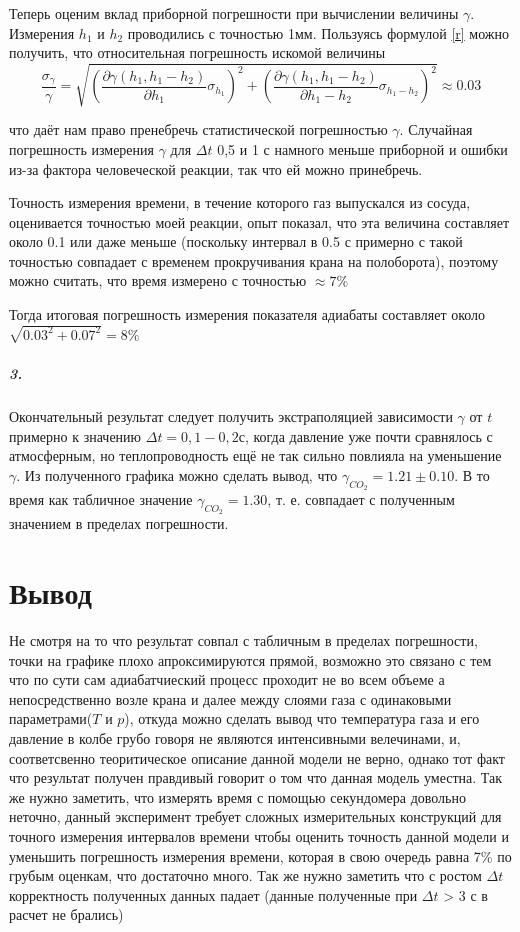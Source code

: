 \documentclass[a4paper,12pt]{article}
\begin{document}
Теперь оценим вклад приборной погрешности при вычислении величины $\gamma$. Измерения $h_1$  и $h_2$ проводились с точностью 1мм. Пользуясь формулой \eqref{r} можно получить, что относительная погрешность искомой величины $$\dfrac{\sigma_\gamma}{\gamma} = \sqrt{\left(\dfrac{\partial\gamma(h_1, h_1 - h_2)}{\partial h_1}\sigma_{h_1}\right)^2 + {\left(\dfrac{\partial\gamma(h_1, h_1 - h_2)}{\partial h_1 - h_2}\sigma_{h_1 - h_2}\right)^2} }\approx 0.03$$

что даёт нам право пренебречь статистической погрешностью $\gamma$. Случайная погрешность измерения $\gamma$ для $\Delta t$ 0,5 и 1 с намного меньше приборной и ошибки из-за фактора человеческой реакции, так что ей можно принебречь.


Точность измерения времени, в течение которого газ выпускался из сосуда, оценивается точностью моей реакции, опыт показал, что эта величина составляет около 0.1 или даже меньше (поскольку интервал в 0.5 с примерно с такой точностью совпадает с временем прокручивания крана на полоборота), поэтому можно считать, что время измерено с точностью $\approx 7\%$

Тогда итоговая погрешность измерения показателя адиабаты составляет около $\sqrt{0.03^2+0.07^2} = 8\%$

	

\subparagraph*{3.} Окончательный результат следует получить экстраполяцией зависимости $\gamma$ от $t$ примерно к значению $\Delta t = 0,1 - 0,2 с$, когда давление уже почти сравнялось с атмосферным, но теплопроводность ещё не так сильно повлияла на уменьшение $\gamma$. Из полученного графика можно сделать вывод, что $\gamma_{CO_2} = 1.21 \pm 0.10$. В то время как табличное значение $\gamma_{CO_2} = 1.30$, т. е. совпадает с полученным значением в пределах погрешности. 


\section*{Вывод}
	

	Не смотря на то что результат совпал с табличным в пределах погрешности, точки на графике плохо апроксимируются прямой, возможно это связано с тем что по сути сам адиабатчиеский процесс проходит не во всем объеме а непосредственно возле крана и далее между слоями газа с одинаковыми параметрами($T$ и $p$), откуда можно сделать вывод что температура газа и его давление в колбе грубо говоря не являются интенсивными велечинами, и, соответсвенно теоритическое описание данной модели не верно, однако тот факт что результат получен правдивый говорит о том что данная модель уместна. Так же нужно заметить, что измерять время с помощью секундомера довольно неточно, данный эксперимент требует сложных измерительных конструкций для точного измерения интервалов времени чтобы оценить точность данной модели и уменьшить погрешность измерения времени, которая в свою очередь равна 7\% по грубым оценкам, что достаточно много. Так же нужно заметить что с ростом $\Delta t$ корректность полученных данных падает (данные полученные при $\Delta t$ > 3 с в расчет не брались)
\end{document}
